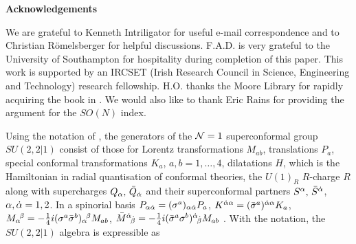 \medskip
\noindent
{\bf Acknowledgements}

We are grateful to Kenneth Intriligator for useful e-mail
correspondence and to Christian R\"omelsberger for
helpful discussions.    F.A.D. is very grateful to the
University of Southampton for hospitality during
completion of this paper.  This work is supported by
an IRCSET (Irish Research Council in Science, Engineering and
Technology) research fellowship. H.O. thanks the Moore
Library for rapidly acquiring the book in \spi. We would also like
to thank Eric Rains for providing the argument for the $SO(N)$ index.
\vfill\eject


Using the notation of \char, the generators of the ${\cal N}=1$ superconformal group 
$SU(2,2|1)$ consist of those for Lorentz transformations $M_{a b}$, translations
$P_a$, special conformal transformations $K_a$, $a,b=1,\dots, 4$, dilatations
$H$, which is the Hamiltonian in radial quantisation of conformal theories,
the $U(1)_R$ $R$-charge $R$ along with supercharges
$Q_{{\alpha}},\, {\bar Q}_{\smash{{\dot \alpha}}}$ and their superconformal partners
$S^{{\alpha}},\,{\bar S}^{{\dot \alpha}}$, ${\alpha},{\dot \alpha}=1,2$.  
In a spinorial basis $P_{\alpha{\dot \alpha}} = (\sigma^a)_{\alpha{\dot \alpha}} P_a$,
${K}{}^{{\dot \alpha}\alpha} = (\bar \sigma^a)^{{\dot \alpha}\alpha} K_a$,
$ M_\alpha{}^{\! \beta} = - {\textstyle {1 \over 4}} i ( \sigma^a \bar \sigma^b)_\alpha{}^{\! \beta}
M_{ab}$, ${\bar M}{}^{\dot \alpha}{}_{\!\smash{{\dot \beta}}} = - {\textstyle {1 \over 4}} i
( \bar \sigma^a \sigma^b)^{\dot \alpha}{}_{\!\smash{{\dot \beta}}} M_{ab}${
}. With the notation,
\eqn\defMab{
\M_\A{}^{\! \B} = \pmatrix{ M_\alpha{}^{\! \beta} + \half
\de_\alpha{}^{\! \beta} H & \half \, P_{\smash{\alpha\dbe}} \cr
\half \, {K}{}^{\dal\beta} & {\bar M}{}^\dal{}_{\!\smash{\dbe}}
- \half \de{}^\dal{}_{\!\smash{\dbe}} H \cr} \, , \ \
\Q_\A = \pmatrix{Q_{ \alpha}\cr  \bS^{\dal}} \, , \ \
{\bar \Q}^\B = \pmatrix{ S^{\!\beta}& \bQ_{\smash {\dbe}} }\, ,
}
the $SU(2,2|1)$ algebra is expressible as
\eqn\comm{\eqalign{
\big [ \M_\A{}^{\! \B}, \M_\C{}^{\! \D} \big ] = {}& \de_\C{}^{\! \B}
\M_\A{}^{\! \D} - \de_\A{}^{\! \D} \M_\C{}^{\! \B} \, , \cr
\big [ \M_\A{}^{\! \B}, \Q_\C \big ] = {}& \de_\C{}^{\! \B}
\Q_\A - \quar \de_\A{}^{\! \B} \Q_\C \, , \qquad
\big [ \M_\A{}^{\! \B}, {\bar \Q}^\C \big ] = - \de_\A{}^{\! \C}
{\bar \Q}^\B + \quar \de_\A{}^{\! \B} {\bar \Q}^\C \, , \cr
\big [ R ,  \Q_\A \big ] = {}& -\Q_\A \, , \qquad \,
\big [R , {\bar \Q}^\B \big ] =  {\bar \Q}^\B\, , \cr
\big \{ \Q_\A , {\bar \Q}^\B \big \} = {}& 4
\M_\A{}^{\! \B} +3 \de_\A{}^{\! \B} R\, , \quad
\big \{ \Q_\A , \Q_\B  \big \} = 0 \, , \quad
\{ {\bar \Q}^\A , {\bar \Q}^\B \big \} = 0 \, ,\cr}
}

